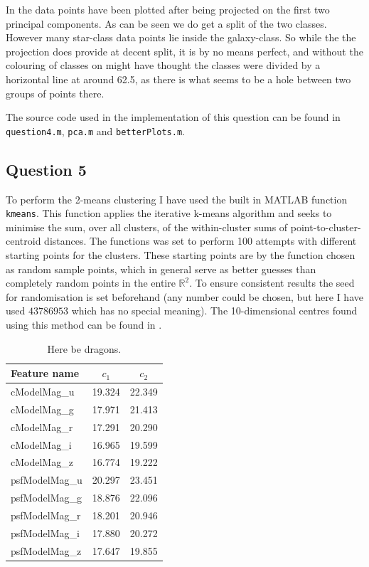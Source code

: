 \documentclass[a4paper, 11pt]{article}
\begin{document}
In  the data points have been plotted after being projected on the first two principal components. As can be seen we do get a split of the two classes. However many star-class data points lie inside the galaxy-class. So while the the projection does provide at decent split, it is by no means perfect, and without the colouring of classes on might have thought the classes were divided by a horizontal line at around 62.5, as there is what seems to be a hole between two groups of points there.

The source code used in the implementation of this question can be found in \texttt{question4.m}, \texttt{pca.m} and \texttt{betterPlots.m}.

\subsection*{Question 5}
To perform the 2-means clustering I have used the built in MATLAB function \texttt{kmeans}. This function applies the iterative k-means algorithm and seeks to minimise the sum, over all clusters, of the within-cluster sums of point-to-cluster-centroid distances. The functions was set to perform 100 attempts with different starting points for the clusters. These starting points are by the function chosen as random sample points, which in general serve as better guesses than completely random points in the entire $\mathbb{R}^2$. To ensure consistent results the seed for randomisation is set beforehand (any number could be chosen, but here I have used $43786953$ which has no special meaning). The 10-dimensional centres found using this method can be found in .

\begin{table}[H]
    \centering
    \begin{tabular}{lcc}
        \toprule
        Feature name & $c_1$ & $c_2$ \\
        \midrule
        cModelMag\_u & 19.324 & 22.349 \\
        cModelMag\_g & 17.971 & 21.413 \\
        cModelMag\_r & 17.291 & 20.290 \\
        cModelMag\_i & 16.965 & 19.599 \\
        cModelMag\_z & 16.774 & 19.222 \\
        psfModelMag\_u & 20.297 & 23.451 \\
        psfModelMag\_g & 18.876 & 22.096 \\
        psfModelMag\_r & 18.201 & 20.946 \\
        psfModelMag\_i & 17.880 & 20.272 \\
        psfModelMag\_z & 17.647 & 19.855 \bottomrule
    \end{tabular}
    \caption{Here be dragons.}\label{tab:question4}
\end{table}
\end{document}
